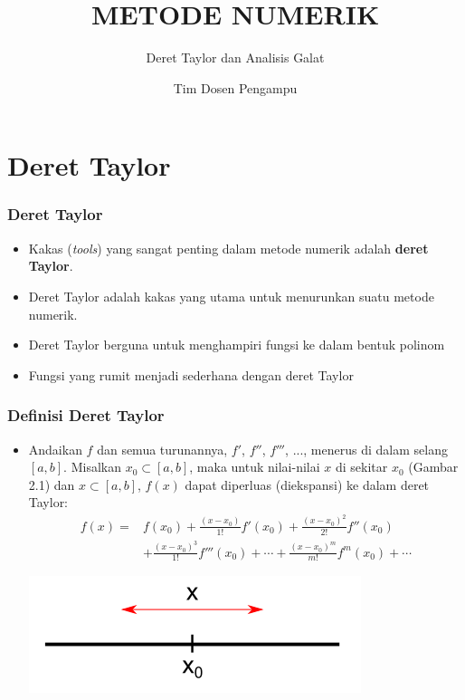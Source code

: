 \documentclass[pdflatex,compress]{beamer}
\title{METODE NUMERIK}
\subtitle{Deret Taylor dan Analisis Galat}
\author{Tim Dosen Pengampu}
\begin{document}
	
\maketitle
\section{Deret Taylor}

\begin{frame}
	\frametitle{Deret Taylor}
	\begin{itemize}
		\item Kakas (\textit{tools}) yang sangat penting dalam metode numerik adalah \textbf{deret Taylor}.
		\item Deret Taylor adalah kakas yang utama untuk menurunkan suatu metode numerik.
		\item Deret Taylor berguna untuk menghampiri fungsi ke dalam bentuk polinom
		\item Fungsi yang rumit menjadi sederhana dengan deret Taylor
	\end{itemize}
\end{frame}

\begin{frame}
	\frametitle{Definisi Deret Taylor}
	\begin{itemize}
		\item Andaikan $ f $ dan semua turunannya, $ f' $, $ f'' $, $ f''' $, ..., menerus di dalam selang $ [a, b] $. Misalkan $ x_0 \subset [a, b] $, maka untuk nilai-nilai $ x $ di sekitar $ x_0 $ (Gambar 2.1) dan $ x \subset [a, b] $, $ f(x) $ dapat diperluas (diekspansi) ke dalam deret Taylor:
		\begin{align*}
			f(x) =& f(x_0) + \frac{(x-x_0)}{1!}f'(x_0) + \frac{(x-x_0)^2}{2!}f''(x_0) \\
			&+ \frac{(x-x_0)^3}{1!}f'''(x_0) + \cdots + \frac{(x-x_0)^m}{m!}f^m(x_0) + \cdots
		\end{align*}
		\begin{center}
			\includegraphics[width=0.5\linewidth]{img/img101}
		\end{center}
	\end{itemize}
\end{frame}
\end{document}
